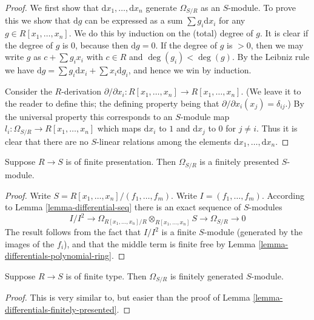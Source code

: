 \begin{proof}
We first show that $\text{d}x_1, \ldots, \text{d}x_n$
generate $\Omega_{S/R}$ as an $S$-module. To prove this
we show that $\text{d}g$ can be expressed as a
sum $\sum g_i \text{d}x_i$ for any $g \in R[x_1, \ldots, x_n]$.
We do this by induction on the (total) degree of $g$.
It is clear if the degree of $g$ is $0$, because then
$\text{d}g = 0$. If the degree of $g$ is $> 0$, then
we may write $g$ as $c + \sum g_i x_i$ with $c\in R$
and $\deg(g_i) < \deg(g)$. By the Leibniz rule we have
$\text{d}g = \sum g_i \text{d} x_i + \sum x_i \text{d}g_i$,
and hence we win by induction.

\medskip\noindent
Consider the $R$-derivation $\partial / \partial x_i :
R[x_1, \ldots, x_n] \to R[x_1, \ldots, x_n]$. (We leave it to
the reader to define this; the defining property
being that $\partial / \partial x_i (x_j) = \delta_{ij}$.)
By the universal property this corresponds to an $S$-module map $l_i :
\Omega_{S/R} \to R[x_1, \ldots, x_n]$ which maps $\text{d}x_i$
to $1$ and $\text{d}x_j$ to $0$ for $j \not = i$.
Thus it is clear that there are no $S$-linear relations
among the elements $\text{d}x_1, \ldots, \text{d}x_n$.
\end{proof}

\begin{lemma}
\label{lemma-differentials-finitely-presented}
Suppose $R \to S$ is of finite presentation.
Then $\Omega_{S/R}$ is a finitely presented
$S$-module.
\end{lemma}

\begin{proof}
Write $S = R[x_1, \ldots, x_n]/(f_1, \ldots, f_m)$.
Write $I = (f_1, \ldots, f_m)$. According
to Lemma \ref{lemma-differential-seq} there is an exact sequence
of $S$-modules
$$
I/I^2
\to
\Omega_{R[x_1, \ldots, x_n]/R} \otimes_{R[x_1, \ldots, x_n]} S
\to
\Omega_{S/R}
\to
0
$$
The result follows from the fact that $I/I^2$ is a finite
$S$-module (generated by the images of the $f_i$), and that
the middle term is finite free by
Lemma \ref{lemma-differentials-polynomial-ring}.
\end{proof}

\begin{lemma}
\label{lemma-differentials-finitely-generated}
Suppose $R \to S$ is of finite type.
Then $\Omega_{S/R}$ is finitely generated
$S$-module.
\end{lemma}

\begin{proof}
This is very similar to, but easier than the proof
of Lemma \ref{lemma-differentials-finitely-presented}.
\end{proof}








